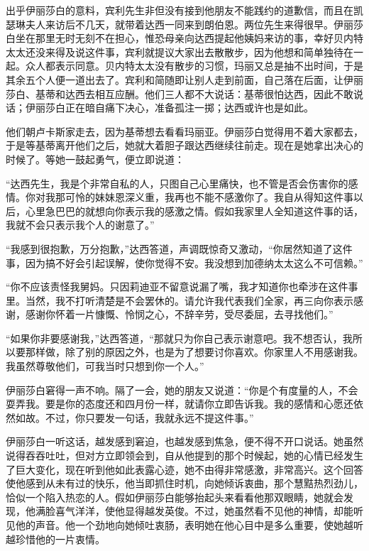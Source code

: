 \par 出乎伊丽莎白的意料，宾利先生非但没有接到他朋友不能践约的道歉信，而且在凯瑟琳夫人来访后不几天，就带着达西一同来到朗伯恩。两位先生来得很早。伊丽莎白坐在那里无时无刻不在担心，惟恐母亲向达西提起他姨妈来访的事，幸好贝内特太太还没来得及说这件事，宾利就提议大家出去散散步，因为他想和简单独待在一起。众人都表示同意。贝内特太太没有散步的习惯，玛丽又总是抽不出时间，于是其余五个人便一道出去了。宾利和简随即让别人走到前面，自己落在后面，让伊丽莎白、基蒂和达西去相互应酬。他们三人都不大说话：基蒂很怕达西，因此不敢说话；伊丽莎白正在暗自痛下决心，准备孤注一掷；达西或许也是如此。
\par 他们朝卢卡斯家走去，因为基蒂想去看看玛丽亚。伊丽莎白觉得用不着大家都去，于是等基蒂离开他们之后，她就大着胆子跟达西继续往前走。现在是她拿出决心的时候了。等她一鼓起勇气，便立即说道：
\par “达西先生，我是个非常自私的人，只图自己心里痛快，也不管是否会伤害你的感情。你对我那可怜的妹妹恩深义重，我再也不能不感激你了。我自从得知这件事以后，心里急巴巴的就想向你表示我的感激之情。假如我家里人全知道这件事的话，我就不会只表示我个人的谢意了。”
\par “我感到很抱歉，万分抱歉，”达西答道，声调既惊奇又激动，“你居然知道了这件事，因为搞不好会引起误解，使你觉得不安。我没想到加德纳太太这么不可信赖。”
\par “你不应该责怪我舅妈。只因莉迪亚不留意说漏了嘴，我才知道你也牵涉在这件事里。当然，我不打听清楚是不会罢休的。请允许我代表我们全家，再三向你表示感谢，感谢你怀着一片慷慨、怜悯之心，不辞辛劳，受尽委屈，去寻找他们。”
\par “如果你非要感谢我，”达西答道，“那就只为你自己表示谢意吧。我不想否认，我所以要那样做，除了别的原因之外，也是为了想要讨你喜欢。你家里人不用感谢我。我虽然尊敬他们，可我当时只想到你一个人。”
\par 伊丽莎白窘得一声不响。隔了一会，她的朋友又说道：“你是个有度量的人，不会耍弄我。要是你的态度还和四月份一样，就请你立即告诉我。我的感情和心愿还依然如故。不过，你只要发一句话，我就永远不提这件事。”
\par 伊丽莎白一听这话，越发感到窘迫，也越发感到焦急，便不得不开口说话。她虽然说得吞吞吐吐，但对方立即领会到，自从他提到的那个时候起，她的心情已经发生了巨大变化，现在听到他如此表露心迹，她不由得非常感激，非常高兴。这个回答使他感到从未有过的快乐，他当即抓住时机，向她倾诉衷曲，那个慧黠热烈劲儿，恰似一个陷入热恋的人。假如伊丽莎白能够抬起头来看看他那双眼睛，她就会发现，他满脸喜气洋洋，使他显得越发英俊。不过，她虽然看不见他的神情，却能听见他的声音。他一个劲地向她倾吐衷肠，表明她在他心目中是多么重要，使她越听越珍惜他的一片衷情。
